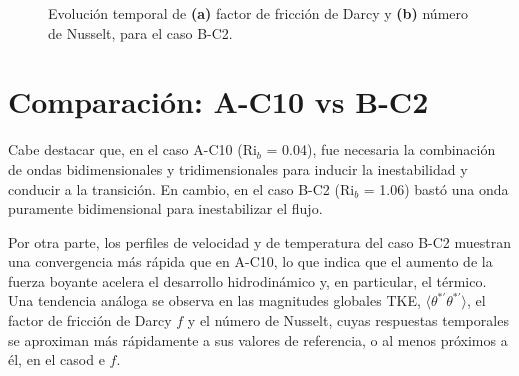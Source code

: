 \begin{figure}[H]
  \centering  
    
  \caption{Evolución temporal de \textbf{(a)} factor de fricción de Darcy y \textbf{(b)} número de Nusselt, para el caso B-C2.}
  \label{fig:bc2-1}
\end{figure}

\section{Comparación: A-C10 vs B-C2}
Cabe destacar que, en el caso A-C10 (Ri$_b$ = 0.04), fue necesaria la combinación de ondas bidimensionales y tridimensionales para inducir la inestabilidad y conducir a la transición. En cambio, en el caso B-C2 (Ri$_b$ = 1.06) bastó una onda puramente bidimensional para inestabilizar el flujo.

Por otra parte, los perfiles de velocidad y de temperatura del caso B-C2 muestran una convergencia más rápida que en A-C10, lo que indica que el aumento de la fuerza boyante acelera el desarrollo hidrodinámico y, en particular, el térmico. Una tendencia análoga se observa en las magnitudes globales TKE, $\langle \theta^{*\prime}\theta^{*\prime}\rangle$, el factor de fricción de Darcy $f$ y el número de Nusselt, cuyas respuestas temporales se aproximan más rápidamente a sus valores de referencia, o al menos próximos a él, en el casod e $f$.



